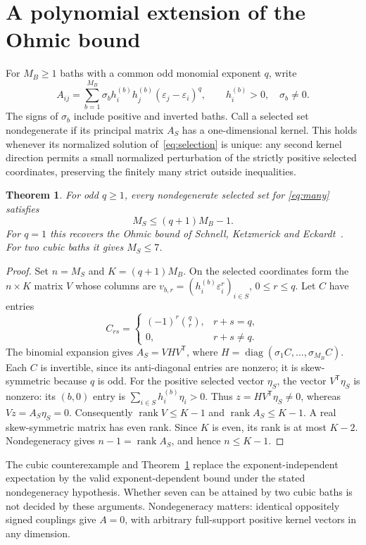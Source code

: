 \documentclass[11pt]{article}
\newtheorem{theorem}{Theorem}
\begin{document}
\section{A polynomial extension of the Ohmic bound}
For $M_B\geq1$ baths with a common odd monomial exponent $q$, write
\begin{equation}\label{eq:many}
 A_{ij}=\sum_{b=1}^{M_B}\sigma_b h_i^{(b)}h_j^{(b)}
                 (\varepsilon_j-\varepsilon_i)^q,
 \qquad h_i^{(b)}>0,\quad \sigma_b\ne0.
\end{equation}
The signs of $\sigma_b$ include positive and inverted baths.
Call a selected set nondegenerate if its principal matrix
$A_S$ has a one-dimensional kernel. This holds whenever its
normalized solution of~\eqref{eq:selection} is unique: any
second kernel direction permits a small normalized perturbation
of the strictly positive selected coordinates, preserving the
finitely many strict outside inequalities.

\begin{theorem}\label{thm:bound}
For odd $q\geq1$, every nondegenerate selected set for
\eqref{eq:many} satisfies
\[
 M_S\leq(q+1)M_B-1.
\]
For $q=1$ this recovers the Ohmic bound of Schnell, Ketzmerick
and Eckardt~\cite[Sec.\ V, Eqs.\ (51)--(54)]{ske}.
For two cubic baths it gives $M_S\leq7$.
\end{theorem}
\begin{proof}
Set $n=M_S$ and $K=(q+1)M_B$. On the selected coordinates
form the $n\times K$ matrix $V$ whose columns are
$v_{b,r}=(h_i^{(b)}\varepsilon_i^r)_{i\in S}$,
$0\leq r\leq q$. Let $C$ have entries
\[
 C_{rs}=\begin{cases}(-1)^r\binom qr,&r+s=q,\\0,&r+s\ne q.
 \end{cases}
\]
The binomial expansion gives $A_S=VHV^{\mathsf T}$, where
$H=\operatorname{diag}(\sigma_1C,\ldots,\sigma_{M_B}C)$.
Each $C$ is invertible, since its anti-diagonal entries are
nonzero; it is skew-symmetric because $q$ is odd.
For the positive selected vector $\eta_S$, the vector
$V^{\mathsf T}\eta_S$ is nonzero: its $(b,0)$ entry is
$\sum_{i\in S}h_i^{(b)}\eta_i>0$.
Thus $z=HV^{\mathsf T}\eta_S\ne0$, whereas $Vz=A_S\eta_S=0$.
Consequently $\operatorname{rank}V\leq K-1$ and
$\operatorname{rank}A_S\leq K-1$. A real skew-symmetric
matrix has even rank. Since $K$ is even, its rank is at most
$K-2$. Nondegeneracy gives $n-1=\operatorname{rank}A_S$,
and hence $n\leq K-1$.
\end{proof}

The cubic counterexample and Theorem~\ref{thm:bound} replace
the exponent-independent expectation by the valid
exponent-dependent bound under the stated nondegeneracy
hypothesis. Whether seven can be attained by two cubic baths
is not decided by these arguments. Nondegeneracy matters:
identical oppositely signed couplings give $A=0$, with arbitrary
full-support positive kernel vectors in any dimension.
\end{document}
